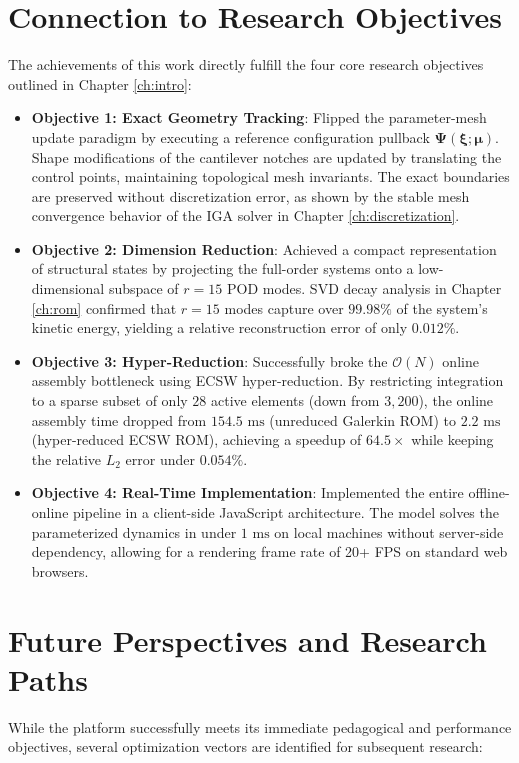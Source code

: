 \section{Connection to Research Objectives}
The achievements of this work directly fulfill the four core research objectives outlined in Chapter \ref{ch:intro}:
\begin{itemize}
    \item \textbf{Objective 1: Exact Geometry Tracking}: Flipped the parameter-mesh update paradigm by executing a reference configuration pullback $\boldsymbol{\Psi}(\boldsymbol{\xi}; \boldsymbol{\mu})$. Shape modifications of the cantilever notches are updated by translating the control points, maintaining topological mesh invariants. The exact boundaries are preserved without discretization error, as shown by the stable mesh convergence behavior of the IGA solver in Chapter \ref{ch:discretization}.
    \item \textbf{Objective 2: Dimension Reduction}: Achieved a compact representation of structural states by projecting the full-order systems onto a low-dimensional subspace of $r=15$ POD modes. SVD decay analysis in Chapter \ref{ch:rom} confirmed that $r=15$ modes capture over $99.98\%$ of the system's kinetic energy, yielding a relative reconstruction error of only $0.012\%$.
    \item \textbf{Objective 3: Hyper-Reduction}: Successfully broke the $\mathcal{O}(N)$ online assembly bottleneck using ECSW hyper-reduction. By restricting integration to a sparse subset of only $28$ active elements (down from $3,200$), the online assembly time dropped from $154.5\text{ ms}$ (unreduced Galerkin ROM) to $2.2\text{ ms}$ (hyper-reduced ECSW ROM), achieving a speedup of $64.5\times$ while keeping the relative $L_2$ error under $0.054\%$.
    \item \textbf{Objective 4: Real-Time Implementation}: Implemented the entire offline-online pipeline in a client-side JavaScript architecture. The model solves the parameterized dynamics in under $1\text{ ms}$ on local machines without server-side dependency, allowing for a rendering frame rate of 20+ FPS on standard web browsers.
\end{itemize}

\section{Future Perspectives and Research Paths}
While the platform successfully meets its immediate pedagogical and performance objectives, several optimization vectors are identified for subsequent research:

